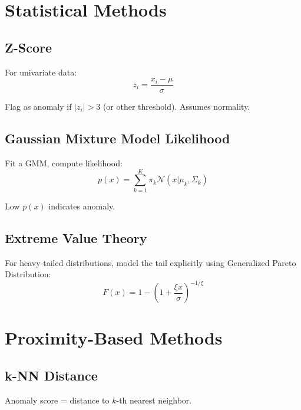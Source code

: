 \section{Statistical Methods}


\subsection{Z-Score}

For univariate data:
\begin{equation}
    z_i = \frac{x_i - \mu}{\sigma}
\end{equation}

Flag as anomaly if $|z_i| > 3$ (or other threshold). Assumes normality.

\subsection{Gaussian Mixture Model Likelihood}

Fit a GMM, compute likelihood:
\begin{equation}
    p(x) = \sum_{k=1}^K \pi_k \mathcal{N}(x | \mu_k, \Sigma_k)
\end{equation}

Low $p(x)$ indicates anomaly.

\subsection{Extreme Value Theory}

For heavy-tailed distributions, model the tail explicitly using Generalized Pareto Distribution:
\begin{equation}
    F(x) = 1 - \left(1 + \frac{\xi x}{\sigma}\right)^{-1/\xi}
\end{equation}


\section{Proximity-Based Methods}

\subsection{k-NN Distance}


Anomaly score = distance to $k$-th nearest neighbor.

